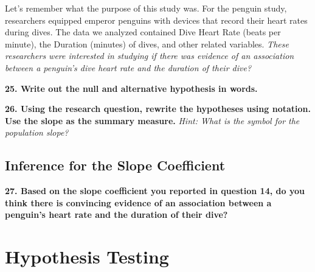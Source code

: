 \documentclass[
  letterpaper,
  DIV=11,
  numbers=noendperiod]{scrartcl}
\begin{document}
Let's remember what the purpose of this study was. For the penguin
study, researchers equipped emperor penguins with devices that record
their heart rates during dives. The data we analyzed contained Dive
Heart Rate (beats per minute), the Duration (minutes) of dives, and
other related variables. \emph{These researchers were interested in
studying if there was evidence of an association between a penguin's
dive heart rate and the duration of their dive?}

\vspace{0.5cm}

\textbf{25. Write out the null and alternative hypothesis in words.}



\vspace{0.5cm}

\textbf{26. Using the research question, rewrite the hypotheses using
notation. Use the slope as the summary measure.} \emph{Hint: What is the
symbol for the population slope?}



\vspace{0.5cm}

\hypertarget{inference-for-the-slope-coefficient}{%
\subsection{Inference for the Slope
Coefficient}\label{inference-for-the-slope-coefficient}}

\textbf{27. Based on the slope coefficient you reported in question 14,
do you think there is convincing evidence of an association between a
penguin's heart rate and the duration of their dive?}


\vspace{0.5cm}

\hypertarget{hypothesis-testing}{%
\section{Hypothesis Testing}\label{hypothesis-testing}}
\end{document}
